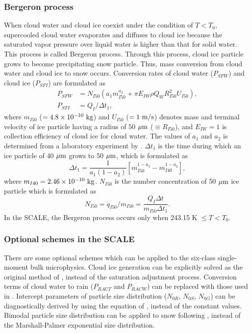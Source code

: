 \subsubsection{Bergeron process}
When cloud water and cloud ice coexist under the condition of $T < T_{0}$, supercooled cloud water evaporates and diffuses to cloud ice because the saturated vapor pressure over liquid water is higher than that for solid water. This process is called Bergeron process. Through this process, cloud ice particle grows to become precipitating snow particle. Thus, mass conversion from cloud water and cloud ice to snow occurs. Conversion rates of cloud water ($P_{SFW}$) and cloud ice ($P_{SFI}$) are formulated as
\begin{align}
  P_{SFW}&=N_{I50}(a_{1}m^{a_{2}}_{I50}+\pi E_{IW}\rho Q_{W}R^2_{I50}U_{I50}), \\
  P_{SFI}&=Q_{I}/\Delta t_{1},
\end{align}
where $m_{I50}$ ($=4.8\times10^{-10} {\rm \ kg}$) and $U_{I50}$ ($=1{\rm \ m/s}$) denotes mass and terminal velocity of ice particle having a radius of 50 ${\rm \mu m}$ ($\equiv R_{I50}$), and $E_{IW}=1$ is collection efficiency of cloud ice for cloud water. The values of $a_{1}$ and $a_{2}$ is determined from a laboratory experiment by \citet{koenig_1971}. $\Delta t_{1}$ is the time during which an ice particle of 40 ${\rm \mu m}$ grows to 50 ${\rm \mu m}$, which is formulated as
\begin{equation}
  \Delta t_{1}=\frac{1}{a_{1}(1-a_{2})}\left[m^{1-a_{2}}_{I50}-m^{1-a_{2}}_{I40}\right],
\end{equation}
where $m_{I40}=2.46\times10^{-10} {\rm \ kg}$. $N_{I50}$ is the number concentration of 50 ${\rm \mu m}$ ice particle which is formulated as
\begin{equation}
  N_{I50}=q_{I50}/m_{I50}=\frac{Q_{I}\Delta t}{m_{I50}\Delta t_{1}}.
\end{equation}
In the SCALE, the Bergeron process occurs only when 243.15 K $\leq T<T_{0}$.

\subsubsection{Optional schemes in the SCALE}
There are some optional schemes which can be applied to the six-class single-moment bulk microphysics. Cloud ice generation can be explicitly solved as the original method of \citet{lin_etal_1983}, instead of the saturation adjustment process. Conversion terms of cloud water to rain ($P_{RAUT}$ and $P_{RACW}$) can be replaced with those used in \citet{khairoutdinov_and_kogan_2000}. Intercept parameters of particle size distribution ($N_{0R}$, $N_{0S}$, $N_{0G}$) can be diagnostically derived by using the equation of \citet{wainwright_etal_2014}, instead of the constant values. Bimodal particle size distribution can be applied to snow following \citet{roh_and_satoh_2007}, instead of the Marshall-Palmer exponential size distribution.
